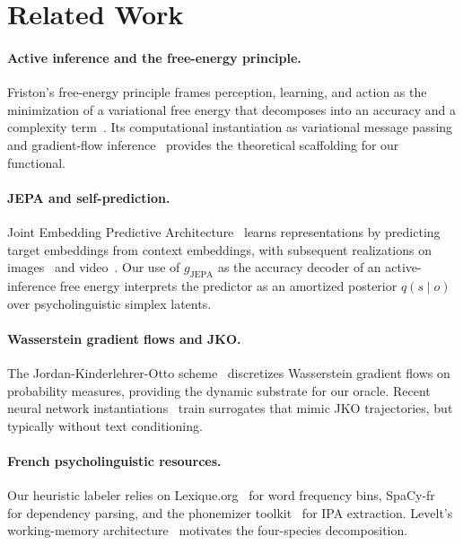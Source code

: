 \section{Related Work}
\label{sec:related}

\paragraph{Active inference and the free-energy principle.}
Friston's free-energy principle frames perception, learning, and action as the minimization of a variational free energy that decomposes into an accuracy and a complexity term~\cite{friston2010}. Its computational instantiation as variational message passing~\cite{parr2017} and gradient-flow inference~\cite{daCosta2020} provides the theoretical scaffolding for our functional.

\paragraph{JEPA and self-prediction.}
Joint Embedding Predictive Architecture~\cite{lecun2022} learns representations by predicting target embeddings from context embeddings, with subsequent realizations on images~\cite{assran2023ijepa} and video~\cite{bardes2024vjepa}. Our use of \( g_{\mathrm{JEPA}} \) as the accuracy decoder of an active-inference free energy interprets the predictor as an amortized posterior \( q(s \mid o) \) over psycholinguistic simplex latents.

\paragraph{Wasserstein gradient flows and JKO.}
The Jordan-Kinderlehrer-Otto scheme~\cite{jko1998} discretizes Wasserstein gradient flows on probability measures, providing the dynamic substrate for our oracle. Recent neural network instantiations~\cite{bunne2022wgf} train surrogates that mimic JKO trajectories, but typically without text conditioning.

\paragraph{French psycholinguistic resources.}
Our heuristic labeler relies on Lexique.org~\cite{newboucard2004lexique} for word frequency bins, SpaCy-fr~\cite{honnibal2020spacy} for dependency parsing, and the phonemizer toolkit~\cite{phonemizer} for IPA extraction. Levelt's working-memory architecture~\cite{levelt1989speaking} motivates the four-species decomposition.
